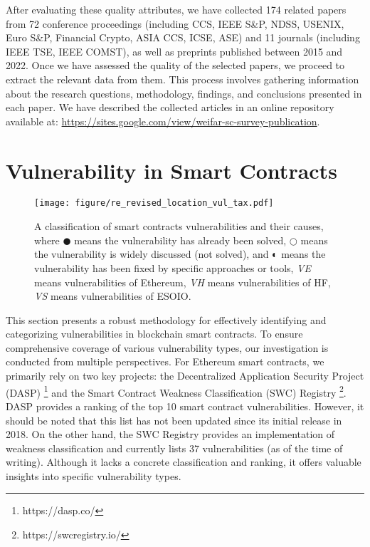 \documentclass[manuscript,screen]{acmart}
\begin{document}
After evaluating these quality attributes, we have collected 174 related papers from 72 conference proceedings (including CCS, IEEE S\&P, NDSS, USENIX, Euro S\&P, Financial Crypto, ASIA CCS, ICSE, ASE) and 11 journals (including IEEE TSE, IEEE COMST), as well as preprints published between 2015 and 2022. Once we have assessed the quality of the selected papers, we proceed to extract the relevant data from them. This process involves gathering information about the research questions, methodology, findings, and conclusions presented in each paper. We have described the collected articles in an online repository available at: \url{https://sites.google.com/view/weifar-sc-survey-publication}.

\section{Vulnerability in Smart Contracts}
\label{vulnerability}

\begin{figure}[!ht]
    \centering
    \texttt{[image: figure/re\_revised\_location\_vul\_tax.pdf]}
    \caption{A classification of smart contracts vulnerabilities and their causes, where $\CIRCLE$  means the vulnerability has already been solved,  $\Circle$ means the vulnerability is widely discussed (not solved), and $\LEFTcircle$ means the vulnerability has been fixed by specific approaches or tools, \textit{VE} means vulnerabilities of Ethereum, \textit{VH} means vulnerabilities of HF, \textit{VS} means vulnerabilities of ESOIO.}
    \label{fig_classification}
\end{figure}

This section presents a robust methodology for effectively identifying and categorizing vulnerabilities in blockchain smart contracts. To ensure comprehensive coverage of various vulnerability types, our investigation is conducted from multiple perspectives. For Ethereum smart contracts, we primarily rely on two key projects: the Decentralized Application Security Project (DASP) \footnote{https://dasp.co/} and the Smart Contract Weakness Classification (SWC) Registry \footnote{https://swcregistry.io/}. DASP provides a ranking of the top 10 smart contract vulnerabilities. However, it should be noted that this list has not been updated since its initial release in 2018. On the other hand, the SWC Registry provides an implementation of weakness classification and currently lists 37 vulnerabilities (as of the time of writing). Although it lacks a concrete classification and ranking, it offers valuable insights into specific vulnerability types.
\end{document}
